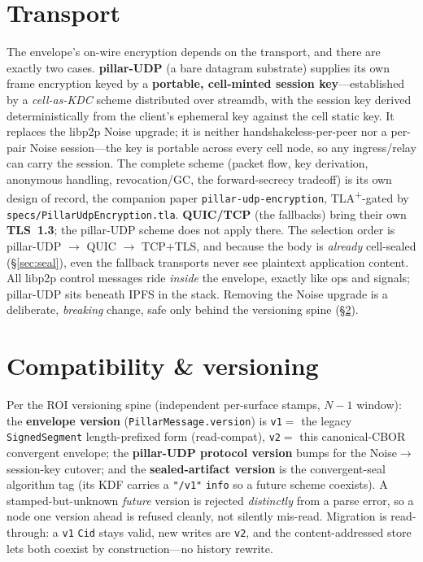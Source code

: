 \documentclass[10pt,twocolumn]{article}
\newcommand{\code}[1]{\texttt{\small #1}}
\newcommand{\Cid}{\code{Cid}}
\begin{document}
\section{Transport}\label{sec:transport}
The envelope's on-wire encryption depends on the transport, and there are exactly
two cases. \textbf{pillar-UDP} (a bare datagram substrate) supplies its own frame
encryption keyed by a \textbf{portable, cell-minted session key}---established by a
\emph{cell-as-KDC} scheme distributed over streamdb, with the session key derived
deterministically from the client's ephemeral key against the cell static key. It
replaces the libp2p Noise upgrade; it is neither handshakeless-per-peer nor a
per-pair Noise session---the key is portable across every cell node, so any
ingress/relay can carry the session. The complete scheme (packet flow, key
derivation, anonymous handling, revocation/GC, the forward-secrecy tradeoff) is its
own design of record, the companion paper \code{pillar-udp-encryption},
TLA\textsuperscript{+}-gated by \code{specs/PillarUdpEncryption.tla}.
\textbf{QUIC/TCP} (the fallbacks) bring their own \textbf{TLS~1.3}; the pillar-UDP
scheme does not apply there. The selection order is pillar-UDP $\to$ QUIC $\to$
TCP$+$TLS, and because the body is \emph{already} cell-sealed (\S\ref{sec:seal}),
even the fallback transports never see plaintext application content. All libp2p
control messages ride \emph{inside} the envelope, exactly like ops and signals;
pillar-UDP sits beneath IPFS in the stack. Removing the Noise upgrade is a
deliberate, \emph{breaking} change, safe only behind the versioning spine
(\S\ref{sec:compat}).

\section{Compatibility \& versioning}\label{sec:compat}
Per the ROI versioning spine (independent per-surface stamps, $N{-}1$ window): the
\textbf{envelope version} (\code{PillarMessage.version}) is \code{v1}$=$ the legacy
\code{SignedSegment} length-prefixed form (read-compat), \code{v2}$=$ this
canonical-CBOR convergent envelope; the \textbf{pillar-UDP protocol version} bumps
for the Noise$\to$session-key cutover; and the \textbf{sealed-artifact version} is
the convergent-seal algorithm tag (its KDF carries a \code{"/v1"} \code{info} so a
future scheme coexists). A stamped-but-unknown \emph{future} version is rejected
\emph{distinctly} from a parse error, so a node one version ahead is refused
cleanly, not silently mis-read. Migration is read-through: a \code{v1} \Cid{} stays
valid, new writes are \code{v2}, and the content-addressed store lets both coexist
by construction---no history rewrite.
\end{document}
